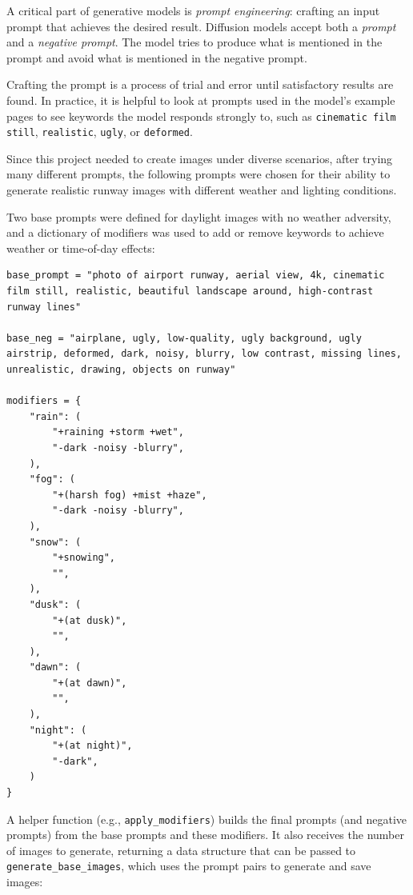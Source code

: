 A critical part of generative models is \emph{prompt engineering}: crafting an input prompt that achieves the desired result. 
Diffusion models accept both a \emph{prompt} and a \emph{negative prompt}. 
The model tries to produce what is mentioned in the prompt and avoid what is mentioned in the negative prompt.

Crafting the prompt is a process of trial and error until satisfactory results are found. 
In practice, it is helpful to look at prompts used in the model's example pages to see keywords the model responds strongly to, such as \texttt{cinematic film still}, \texttt{realistic}, \texttt{ugly}, or \texttt{deformed}.

Since this project needed to create images under diverse scenarios, after trying
many different prompts, the following prompts were chosen for their ability to
generate realistic runway images with different weather and lighting conditions.

Two base prompts were defined for daylight images with no weather adversity, and a dictionary of modifiers was used to add or remove keywords to achieve weather or time-of-day effects:

\begin{lstlisting}
base_prompt = "photo of airport runway, aerial view, 4k, cinematic film still, realistic, beautiful landscape around, high-contrast runway lines"

base_neg = "airplane, ugly, low-quality, ugly background, ugly airstrip, deformed, dark, noisy, blurry, low contrast, missing lines, unrealistic, drawing, objects on runway"

modifiers = {
    "rain": (
        "+raining +storm +wet",
        "-dark -noisy -blurry",
    ),
    "fog": (
        "+(harsh fog) +mist +haze",
        "-dark -noisy -blurry",
    ),
    "snow": (
        "+snowing",
        "",
    ),
    "dusk": (
        "+(at dusk)",
        "",
    ),
    "dawn": (
        "+(at dawn)",
        "",
    ),
    "night": (
        "+(at night)",
        "-dark",
    )
}
\end{lstlisting}

A helper function (e.g., \texttt{apply\_modifiers}) builds the final prompts (and negative prompts) from the base prompts and these modifiers. 
It also receives the number of images to generate, returning a data structure that can be passed to \texttt{generate\_base\_images}, which uses the prompt pairs to generate and save images:

